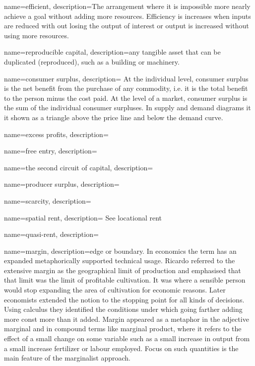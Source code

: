 {
name=efficient,
description={The arrangement where it is impossible more nearly achieve a goal without adding more resources. Efficiency is increases when inputs are reduced with out losing the output of interest or output is increased without using more resources.}
}

{
name=reproducible capital,
description={any tangible asset that can be duplicated (reproduced), such as a building or machinery.}
}


{
name=consumer surplus,
description={%
At the individual level, consumer surplus is the net benefit from the purchase of any commodity, i.e. it is the total benefit to the person minus the cost paid. At the level of a market, consumer surplus is the sum of the individual consumer surpluses. In supply and demand diagrams it it shown as a triangle above the price line and below the demand curve.}
}

{
name=excess profits,
description={}
}

{
name=free entry,
description={}
}

{
name=the second circuit of capital,
description={}
}

{
name=producer surplus,
description={}
}

{
name=scarcity,
description={}
}

{
name=spatial rent,
description={ See \gls{locational rent}}
}

{
name=quasi-rent,
description={}
}


{
name=margin,
description={edge or boundary. In economics the term has an expanded metaphorically supported technical usage. Ricardo referred to the \gls{extensive margin} as the geographical limit of production and emphasised that that limit was the limit of profitable cultivation. It was where a sensible person would stop expanding the area of cultivation for economic reasons. Later economists extended the notion to the stopping point for all kinds of decisions. Using calculus they identified the conditions under which going farther adding more const more than it added.  Margin   appeared as a metaphor in the adjective  \gls{marginal} and in compound terms like \gls{marginal product}, where it refers to the effect of a small change on some variable  such as a small increase in output  from a small increase fertilizer or labour employed. Focus on such quantities is the main feature of the \gls{marginalist} approach. }
}


